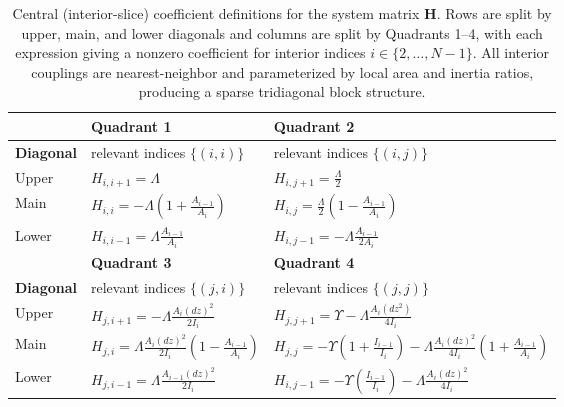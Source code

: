 \documentclass[linenumbers]{aastex7}
\begin{document}
\begin{table}[h!]
    \centering
    {\renewcommand{\arraystretch}{1.6}
    \begin{tabular}{|p{}|p{}|p{}|}
        \hline
        &\textbf{Quadrant 1} & \textbf{Quadrant 2} \\ 
        \hline
        \textbf{Diagonal}&relevant indices $\{(i, i)\}$ & relevant indices $\{(i, j)\}$\\

        \hline \hline
        Upper
        & $\displaystyle H_{i,i+1} = \Lambda$
        & $\displaystyle H_{i, j+1} = \frac{\Lambda}{2}$
        \\
        Main 
        & $\displaystyle H_{i,i} = -\Lambda\left(1+\frac{A_{i-1}}{A_i}\right)$
        & $\displaystyle H_{i, j} = \frac{\Lambda}{2}\left(1 - \frac{A_{i-1}}{A_i}\right)$
        \\
        Lower
        & $\displaystyle H_{i,i-1} = \Lambda \frac{A_{i-1}}{A_i}$
        & $\displaystyle H_{i, j-1} = -\Lambda \frac{A_{i-1}}{2A_i}$
        \\

        \hline 
        \hline
        & \textbf{Quadrant 3} & \textbf{Quadrant 4} \\ 
        \hline
        \textbf{Diagonal}& relevant indices $\{(j, i)\}$ & relevant indices $\{(j, j)\}$\\

        \hline \hline
        Upper
        & $\displaystyle H_{j,i+1} = -\Lambda \frac{A_i(dz)^2}{2I_i}$
        & $\displaystyle H_{j, j+1} = \Upsilon - \Lambda \frac{A_i (dz^2)}{4I_i}$
        \\
        Main 
        & $\displaystyle H_{j,i} = \Lambda \frac{A_i (dz)^2}{2I_i}\left(1 - \frac{A_{i-1}}{A_i}\right)$
        & $\displaystyle H_{j, j} = -\Upsilon\left(1 + \frac{I_{i-1}}{I_i}\right) - \Lambda\frac{A_i (dz)^2}{4I_i}\left(1+\frac{A_{i-1}}{A_i}\right) $
        \\
        Lower
        & $\displaystyle H_{j,i-1} = \Lambda \frac{A_{i-1}(dz)^2}{2I_i}$
        & $\displaystyle H_{i, j-1} = -\Upsilon\left(\frac{I_{i-1}}{I_i}\right) - \Lambda\frac{A_i (dz)^2}{4I_i}$
        
        \\
        \hline
    \end{tabular}
    }
    \caption{Central (interior-slice) coefficient definitions for the system matrix $\mathbf{H}$. Rows are split by upper, main, and lower diagonals and columns are split by Quadrants 1--4, with each expression giving a nonzero coefficient for interior indices $i\in\{2,\dots,N-1\}$. All interior couplings are nearest-neighbor and parameterized by local area and inertia ratios, producing a sparse tridiagonal block structure.}
    \label{tab:Hcomps}
\end{table}
\end{document}
